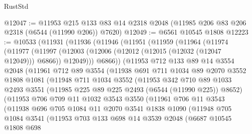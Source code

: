 \begin{lexlean}{RustStd}
\begin{coremodule}
@12047 := @11953
    @215
    @133
    @83
    @14
    @2318
    @2048
    (@11985 @206 @83 @206 @2318 (@6544 (@11990 @206)) @7620)
@12049 := @6561 @10545 @1808
@12223 := @10533
    (@11931
      (@11936
        (@11946
          (@11951
            (@11959
              (@11964
                (@11974
                  (@11977
                    (@11997
                      (@12003 (@12006 (@12012 (@12015 (@12032 (@12047 @12049))) @6866)) @12049)))
                  @6866))
              (@11953
                @712
                @133
                @89
                @14
                @3554
                @2048
                (@11961
                  @712
                  @89
                  @3554
                  (@11938
                    @691
                    @711
                    @1034
                    @89
                    @2070
                    @3552
                    @1808
                    @1081
                    (@11948
                      @711
                      @1034
                      @3552
                      (@11953
                        @342
                        @710
                        @89
                        @1033
                        @2493
                        @3551
                        (@11985 @225 @89 @225 @2493 (@6544 (@11990 @225)) @8652)
                        (@11953
                          @706
                          @709
                          @11
                          @1032
                          @3543
                          @3550
                          (@11961
                            @706
                            @11
                            @3543
                            (@11938
                              @696
                              @705
                              @1084
                              @11
                              @2070
                              @3541
                              @1838
                              @1090
                              (@11948
                                @705
                                @1084
                                @3541
                                (@11953
                                  @703
                                  @133
                                  @698
                                  @14
                                  @3539
                                  @2048
                                  (@6687
                                    @10545
                                    @1808
                                    @698

\end{coremodule}
\end{lexlean}
